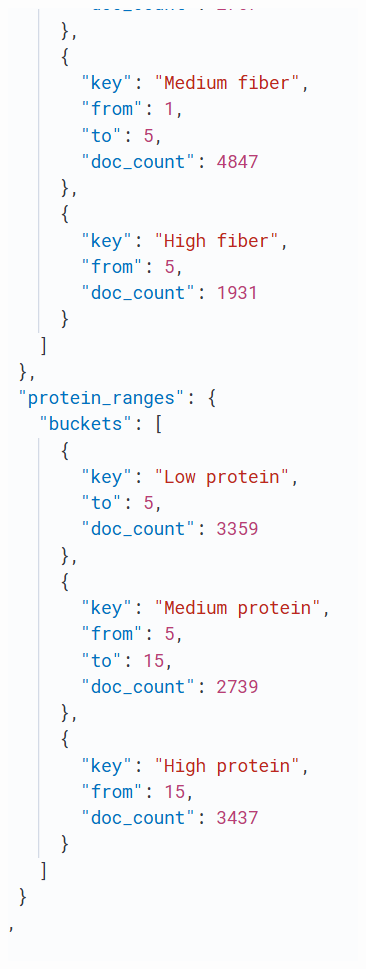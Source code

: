 \begin{enumerate}
\begin{figure}[h!]
\begin{minipage}{0.25\textwidth}
    \end{minipage}%
    \hspace{0.05\textwidth}
    \begin{minipage}{0.25\textwidth}
        \centering
        \includegraphics[width=\textwidth]{Report/ReportLatex/Images/ElasticsearchResults/calories3.png}
    \end{minipage}
    

\end{figure}
\end{enumerate}

